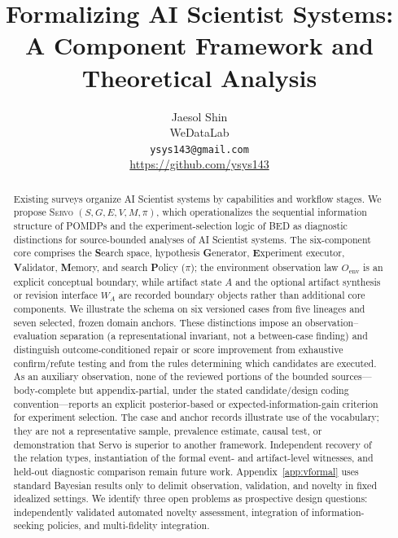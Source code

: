 \documentclass{article}
\title{\textbf{Formalizing AI Scientist Systems:\\
A Component Framework and Theoretical Analysis}}
\author{%
  Jaesol Shin \\
  WeDataLab \\
  \texttt{ysys143@gmail.com} \\
  \url{https://github.com/ysys143}
}
\date{}
\newcommand{\sgmvpi}{$(S, G, E, V, M, \pi)$}
\newcommand{\framework}{\textsc{Servo}}
\begin{document}
\providecommand{\nolinenumbers}{}%
\nolinenumbers

\maketitle

\begin{abstract}
Existing surveys organize AI Scientist systems by capabilities and workflow stages. We propose \framework{} \sgmvpi{}, which operationalizes the sequential information structure of POMDPs and the experiment-selection logic of BED as diagnostic distinctions for source-bounded analyses of AI Scientist systems. The six-component core comprises the \textbf{S}earch space, hypothesis \textbf{G}enerator, \textbf{E}xperiment executor, \textbf{V}alidator, \textbf{M}emory, and search \textbf{P}olicy ($\pi$); the environment observation law $O_{\mathrm{env}}$ is an explicit conceptual boundary, while artifact state $A$ and the optional artifact synthesis or revision interface $W_A$ are recorded boundary objects rather than additional core components. We illustrate the schema on six versioned cases from five lineages and seven selected, frozen domain anchors. These distinctions impose an observation--evaluation separation (a representational invariant, not a between-case finding) and distinguish outcome-conditioned repair or score improvement from exhaustive confirm/refute testing and from the rules determining which candidates are executed. As an auxiliary observation, none of the reviewed portions of the bounded sources---body-complete but appendix-partial, under the stated candidate/design coding convention---reports an explicit posterior-based or expected-information-gain criterion for experiment selection. The case and anchor records illustrate use of the vocabulary; they are not a representative sample, prevalence estimate, causal test, or demonstration that Servo is superior to another framework. Independent recovery of the relation types, instantiation of the formal event- and artifact-level witnesses, and held-out diagnostic comparison remain future work. Appendix~\ref{app:vformal} uses standard Bayesian results only to delimit observation, validation, and novelty in fixed idealized settings. We identify three open problems as prospective design questions: independently validated automated novelty assessment, integration of information-seeking policies, and multi-fidelity integration.
\end{abstract}
\end{document}
